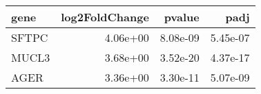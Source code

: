 \begin{tabular}{lrrr}
\toprule
 gene &  log2FoldChange &   pvalue &     padj \\
\midrule
SFTPC &        4.06e+00 & 8.08e-09 & 5.45e-07 \\
MUCL3 &        3.68e+00 & 3.52e-20 & 4.37e-17 \\
 AGER &        3.36e+00 & 3.30e-11 & 5.07e-09 \\
\bottomrule
\end{tabular}
